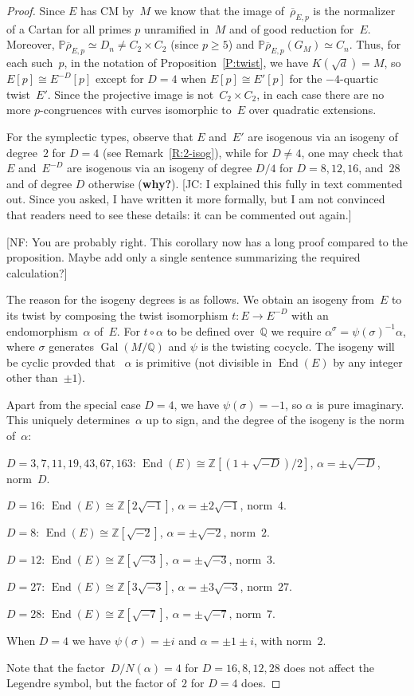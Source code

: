 \documentclass[12pt, reqno]{amsart}
\newcommand{\PP}{\mathbb{P}}
\newcommand{\Q}{\mathbb{Q}}
\newcommand{\Z}{\mathbb{Z}}
\newcommand{\rhobar}{{\overline{\rho}}}
\DeclareMathOperator{\End}{End}
\DeclareMathOperator{\Gal}{Gal}
\numberwithin{equation}{section}
\theoremstyle{definition}
\theoremstyle{remark}
\newcommand{\nf}[1]{{\color{blue} \textsf{[NF: #1]}}}
\newcommand{\jc}[1]{{\color{darkgreen} \textsf{[JC: #1]}}}
\begin{document}
\begin{proof}
Since $E$ has CM by~$M$ we know that the image of~$\rhobar_{E,p}$ is
the normalizer of a Cartan for all primes $p$ unramified in~$M$ and of
good reduction for~$E$.  Moreover, $\PP \rhobar_{E,p} \simeq D_n \neq
C_2 \times C_2$ (since $p \geq 5$) and $\PP \rhobar_{E,p}(G_M) \simeq
C_n$. Thus, for each such~$p$, in the notation of
Proposition~\ref{P:twist}, we have $K(\sqrt{d})=M$, so $E[p]\cong
E^{-D}[p]$ except for $D=4$ when $E[p]\cong E'[p]$ for the
$-4$-quartic twist~$E'$.  Since the projective image is not~$C_2\times
C_2$, in each case there are no more $p$-congruences with curves
isomorphic to~$E$ over quadratic extensions.

For the symplectic types, observe that $E$ and~$E'$ are isogenous via
an isogeny of degree~$2$ for $D=4$ (see Remark~\ref{R:2-isog}), while
for $D\not=4$, one may check that $E$ and~$E^{-D}$ are isogenous via
an isogeny of degree $D/4$ for $D=8,12,16$, and~$28$ and of degree $D$
otherwise ({\bf why?}).  \jc{I explained this fully in text commented
  out.  Since you asked, I have written it more formally, but I am not
  convinced that readers need to see these details: it can be
  commented out again.}

\nf{You are probably right. This corollary now has a long proof compared to the proposition. Maybe add only a single sentence summarizing the required calculation?}  
  
The reason for the isogeny degrees is as follows.  We obtain an
isogeny from~$E$ to its twist by composing the twist isomorphism
$t:E\to E^{-D}$ with an endomorphism~$\alpha$ of~$E$.  For
$t\circ\alpha$ to be defined over~$\Q$ we require
$\alpha^{\sigma}=\psi(\sigma)^{-1}\alpha$, where $\sigma$ generates
$\Gal(M/\Q)$ and $\psi$ is the twisting cocycle.  The isogeny will be
cyclic provded that ~$\alpha$ is primitive (not divisible in $\End(E)$
by any integer other than~$\pm1$).

Apart from the special case $D=4$, we have $\psi(\sigma)=-1$, so
$\alpha$ is pure imaginary.  This uniquely determines~$\alpha$ up to
sign, and the degree of the isogeny is the norm of~$\alpha$:

$D = 3, 7, 11, 19, 43, 67, 163$: $\End(E)\cong\Z[(1+\sqrt{-D})/2]$,
$\alpha=\pm\sqrt{-D}$, norm~$D$.

$D = 16$: $\End(E)\cong\Z[2\sqrt{-1}]$, $\alpha=\pm2\sqrt{-1}$, norm~$4$.

$D = 8$: $\End(E)\cong\Z[\sqrt{-2}]$, $\alpha=\pm\sqrt{-2}$, norm~$2$.

$D = 12$: $\End(E)\cong\Z[\sqrt{-3}]$, $\alpha=\pm\sqrt{-3}$, norm~$3$.

$D = 27$: $\End(E)\cong\Z[3\sqrt{-3}]$, $\alpha=\pm3\sqrt{-3}$, norm~$27$.

$D = 28$: $\End(E)\cong\Z[\sqrt{-7}]$, $\alpha=\pm\sqrt{-7}$, norm~$7$.


When $D=4$ we have $\psi(\sigma)=\pm i$ and $\alpha=\pm1\pm i$, with
norm~$2$.


Note that the factor~$D/N(\alpha)=4$ for $D=16,8,12,28$ does not
affect the Legendre symbol, but the factor of~$2$ for $D=4$ does.
\end{proof}
\end{document}
